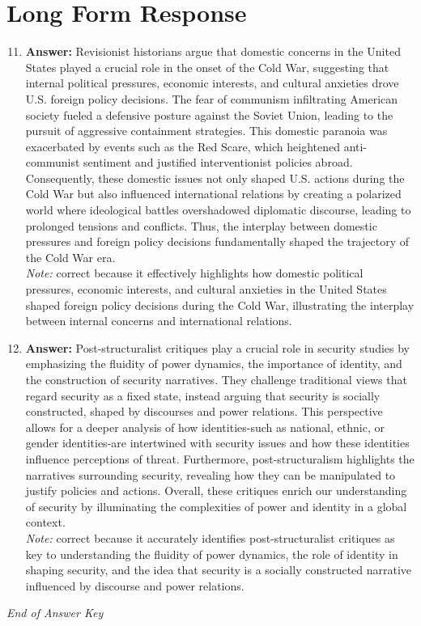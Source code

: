 \documentclass[12pt]{article}
\begin{document}
\section*{Long Form Response}
\begin{enumerate}[label=\arabic*.]
\setcounter{enumi}{10}
\item \textbf{Answer:} Revisionist historians argue that domestic concerns in the United States played a crucial role in the onset of the Cold War, suggesting that internal political pressures, economic interests, and cultural anxieties drove U.S. foreign policy decisions. The fear of communism infiltrating American society fueled a defensive posture against the Soviet Union, leading to the pursuit of aggressive containment strategies. This domestic paranoia was exacerbated by events such as the Red Scare, which heightened anti-communist sentiment and justified interventionist policies abroad. Consequently, these domestic issues not only shaped U.S. actions during the Cold War but also influenced international relations by creating a polarized world where ideological battles overshadowed diplomatic discourse, leading to prolonged tensions and conflicts. Thus, the interplay between domestic pressures and foreign policy decisions fundamentally shaped the trajectory of the Cold War era.
\\ \textit{Note:} correct because it effectively highlights how domestic political pressures, economic interests, and cultural anxieties in the United States shaped foreign policy decisions during the Cold War, illustrating the interplay between internal concerns and international relations.
\item \textbf{Answer:} Post-structuralist critiques play a crucial role in security studies by emphasizing the fluidity of power dynamics, the importance of identity, and the construction of security narratives. They challenge traditional views that regard security as a fixed state, instead arguing that security is socially constructed, shaped by discourses and power relations. This perspective allows for a deeper analysis of how identities-such as national, ethnic, or gender identities-are intertwined with security issues and how these identities influence perceptions of threat. Furthermore, post-structuralism highlights the narratives surrounding security, revealing how they can be manipulated to justify policies and actions. Overall, these critiques enrich our understanding of security by illuminating the complexities of power and identity in a global context.
\\ \textit{Note:} correct because it accurately identifies post-structuralist critiques as key to understanding the fluidity of power dynamics, the role of identity in shaping security, and the idea that security is a socially constructed narrative influenced by discourse and power relations.
\end{enumerate}

\vfill
\noindent\textit{End of Answer Key}
\end{document}
